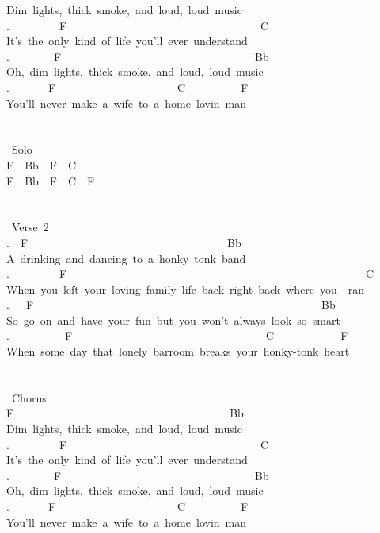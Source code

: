 {Dim\ lights,\ thick\ smoke,\ and\ loud,\ loud\ music\\
.\ \ \ \ \ \ \ \ \ F\ \ \ \ \ \ \ \ \ \ \ \ \ \ \ \ \ \ \ \ \ \ \ \ \ \ \ \ \ \ \ \ \ \ \ C\\
It's\ the\ only\ kind\ of\ life\ you'll\ ever\ understand\\
.\ \ \ \ \ \ \ \ F\ \ \ \ \ \ \ \ \ \ \ \ \ \ \ \ \ \ \ \ \ \ \ \ \ \ \ \ \ \ \ \ \ \ \ Bb\\
Oh,\ dim\ lights,\ thick\ smoke,\ and\ loud,\ loud\ music\\
.\ \ \ \ \ \ \ F\ \ \ \ \ \ \ \ \ \ \ \ \ \ \ \ \ \ \ \ \ \ C\ \ \ \ \ \ \ \ \ \ F\\
You'll\ never\ make\ a\ wife\ to\ a\ home\ lovin\ man\\
\\
\\
\lbrack\ Solo\rbrack\\
F\ \ Bb\ \ F\ \ C\\
F\ \ Bb\ \ F\ \ C\ \ F\\
\\
\\
\lbrack\ Verse\ 2\rbrack\\
.\ \ F\ \ \ \ \ \ \ \ \ \ \ \ \ \ \ \ \ \ \ \ \ \ \ \ \ \ \ \ \ \ \ \ \ \ \ \ Bb\\
A\ drinking\ and\ dancing\ to\ a\ honky\ tonk\ band\\
.\ \ \ \ \ \ \ \ \ F\ \ \ \ \ \ \ \ \ \ \ \ \ \ \ \ \ \ \ \ \ \ \ \ \ \ \ \ \ \ \ \ \ \ \ \ \ \ \ \ \ \ \ \ \ \ \ \ \ \ \ \ \ \ C\\
When\ you\ left\ your\ loving\ family\ life\ back\ right\ back\ where\ you\ \ ran\\
.\ \ \ F\ \ \ \ \ \ \ \ \ \ \ \ \ \ \ \ \ \ \ \ \ \ \ \ \ \ \ \ \ \ \ \ \ \ \ \ \ \ \ \ \ \ \ \ \ \ \ \ \ \ \ \ Bb\\
So\ go\ on\ and\ have\ your\ fun\ but\ you\ won't\ always\ look\ so\ smart\\
.\ \ \ \ \ \ \ \ \ \ F\ \ \ \ \ \ \ \ \ \ \ \ \ \ \ \ \ \ \ \ \ \ \ \ \ \ \ \ \ \ \ \ \ \ \ C\ \ \ \ \ \ \ \ \ \ \ \ F\\
When\ some\ day\ that\ lonely\ barroom\ breaks\ your\ honky-tonk\ heart\\
\\
\\
\lbrack\ Chorus\rbrack\\
F\ \ \ \ \ \ \ \ \ \ \ \ \ \ \ \ \ \ \ \ \ \ \ \ \ \ \ \ \ \ \ \ \ \ \ \ \ \ \ Bb\\
Dim\ lights,\ thick\ smoke,\ and\ loud,\ loud\ music\\
.\ \ \ \ \ \ \ \ \ F\ \ \ \ \ \ \ \ \ \ \ \ \ \ \ \ \ \ \ \ \ \ \ \ \ \ \ \ \ \ \ \ \ \ \ C\\
It's\ the\ only\ kind\ of\ life\ you'll\ ever\ understand\\
.\ \ \ \ \ \ \ \ F\ \ \ \ \ \ \ \ \ \ \ \ \ \ \ \ \ \ \ \ \ \ \ \ \ \ \ \ \ \ \ \ \ \ \ Bb\\
Oh,\ dim\ lights,\ thick\ smoke,\ and\ loud,\ loud\ music\\
.\ \ \ \ \ \ \ F\ \ \ \ \ \ \ \ \ \ \ \ \ \ \ \ \ \ \ \ \ \ C\ \ \ \ \ \ \ \ \ \ F\\
You'll\ never\ make\ a\ wife\ to\ a\ home\ lovin\ man}
